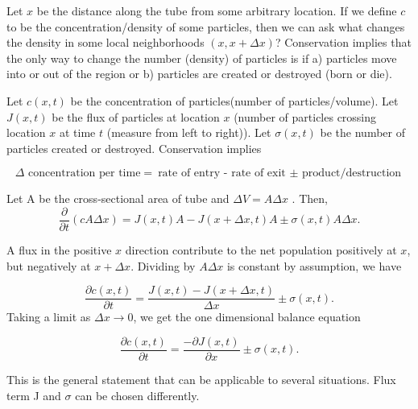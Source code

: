 \documentclass[]{article}
\numberwithin{equation}{section}		%
\begin{document}
Let $x$ be the distance along the tube from some arbitrary location. If we define $c$ to be the concentration/density of some particles, then we can ask what changes the density in some local neighborhoods $(x, x+\Delta x)$? Conservation implies that the only way to change the number (density) of particles is if a) particles move into or out of the region or b) particles are created or destroyed (born or die).

Let $c(x,t)$ be the concentration of particles(number of particles/volume). Let $J(x,t)$  be the flux of particles at location $x$ (number of particles crossing location $x$ at time $t$ (measure from left to right)). Let $\sigma(x,t)$ be the number of particles created or destroyed. Conservation implies

\begin{equation}
	\textrm{$\Delta$ concentration per time}=\text{rate of entry - rate of exit $\pm$ product/destruction}
\end{equation}

Let A be the cross-sectional area of tube and $\Delta V= A \Delta x$ . Then,
\begin{equation}
\frac{\partial}{\partial t} (c A \Delta x) = J(x,t)A-J(x+\Delta x ,t) A \pm \sigma(x,t)A \Delta x .
\end{equation}

A flux in the positive $x$ direction contribute to the net population positively at $x$, but negatively at $x+\Delta x$. Dividing by $A \Delta x$ is constant by assumption, we have

\begin{equation}
\frac{\partial c(x,t)}{\partial t}= \frac{J(x,t)-J(x+\Delta x,t)}{\Delta x} \pm \sigma(x,t).
\end{equation}
 Taking a limit as $\Delta x  \rightarrow 0$, we get the one dimensional balance equation

\begin{equation}
\frac{\partial c(x,t)}{\partial t}= \frac{-\partial J(x,t) }{\partial x} \pm \sigma(x,t).
\end{equation}

\noindent This is the general statement that can be applicable to several situations. Flux term J and $\sigma$ can be chosen differently.
\end{document}
